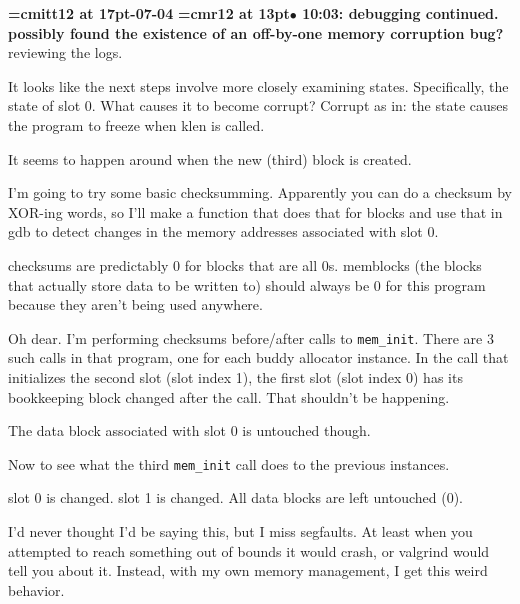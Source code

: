 {\medskip\noindent\bf\font\titlefont=cmitt12 at 17pt-07-04}\medskip
{\smallskip\noindent\bf\font\titlefont=cmr12 at 13pt\titlefont $\bullet$ 10:03: debugging continued. possibly found the existence of an off-by-one memory corruption bug?}\smallskip
reviewing the logs.
\par

It looks like the next steps involve more closely examining states. Specifically, the state of slot 0. What causes it to become corrupt? Corrupt as in: the state causes the program to freeze when klen is called.
\par

It seems to happen around when the new (third) block is created.
\par

I'm going to try some basic checksumming. Apparently you can do a checksum by XOR-ing words, so I'll make a function that does that for blocks and use that in gdb to detect changes in the memory addresses associated with slot 0.
\par

checksums are predictably 0 for blocks that are all 0s. memblocks (the blocks that actually store data to be written to) should always be 0 for this program because they aren't being used anywhere.
\par

Oh dear. I'm performing checksums before/after calls to {\tt mem\_init}. There are 3 such calls in that program, one for each buddy allocator instance. In the call that initializes the second slot (slot index 1), the first slot (slot index 0) has its bookkeeping block changed after the call. That shouldn't be happening.
\par

The data block associated with slot 0 is untouched though.
\par

Now to see what the third {\tt mem\_init} call does to the previous instances.
\par

slot 0 is changed. slot 1 is changed. All data blocks are left untouched (0).
\par

I'd never thought I'd be saying this, but I miss segfaults. At least when you attempted to reach something out of bounds it would crash, or valgrind would tell you about it. Instead, with my own memory management, I get this weird behavior.
\par

